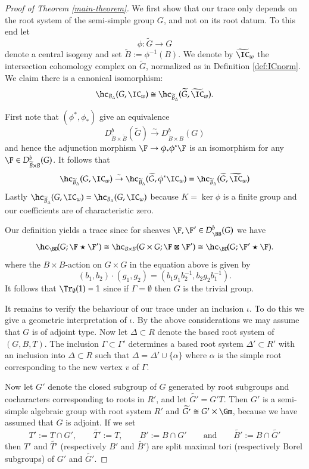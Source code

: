 \documentclass[12pt]{amsart}
\def\to{\rightarrow}
\theoremstyle{remark}
\begin{document}
\begin{proof}[Proof of Theorem \ref{main-theorem}]
We first show that our trace only depends on the root system of
the semi-simple group $G$, and not on its root datum. To this end let
\[
\phi : \widetilde{G} \to G
\]
denote a central isogeny and set $\widetilde{B} := \phi^{-1}(B)$. We
denote by $\widetilde{\IC}_w$ the intersection cohomology
complex on $\widetilde{G}$, normalized as in Definition
\ref{def:ICnorm}. We claim there is a canonical isomorphism:
\[
\hc_{{B}_{\Delta}}(G, \IC_w) \cong \hc_{\widetilde{B}_{\Delta}}(\widetilde{G}, \widetilde{\IC}_w).
\]

First note that $(\phi^*, \phi_*)$ give an equivalence
\[
D^b_{\widetilde{B} \times \widetilde{B}}(\widetilde{G})
\stackrel{\sim}{\to} D^b_{\widetilde{B} \times B}(G)
\]
and hence the
adjunction morphism $\F \to \phi_* \phi^* \F$ is an isomorphism for any $\F \in D^b_{\widetilde{B} \times B}(G)$. It
follows that
\[
\hc_{\widetilde{B}_{\Delta}}(G, \IC_w) \stackrel{\sim}{\to}
\hc_{\widetilde{B}_{\Delta}}(\widetilde{G}, \phi^*\IC_w)
= \hc_{\widetilde{B}_{\Delta}}(\widetilde{G}, \widetilde{\IC}_w)
\]
Lastly $\hc_{\widetilde{B}_{\Delta}}(G, \IC_w) = \hc_{{B}_{\Delta}}(G,
\IC_w)$ because $K = \ker \phi$ is a finite group and our coefficients are of
characteristic zero.

Our definition yields a trace since for sheaves $\F, \F^{\prime} \in D^b_{\BB}(G)$ we have
  \begin{equation*}
    \hc_{\BD}\!(G;\F\star\F')\cong \hc_{B\times B}(G\times G;\F\boxtimes\F')\cong \hc_{\BD}\!(G;\F'\star\F).
  \end{equation*}
where the $B \times B$-action on $G \times G$ in the equation above is given by
\[
(b_1, b_2) \cdot (g_1, g_2) = (b_1g_1b_2^{-1}, b_2g_2b_1^{-1}).
\]
It follows that $\Tr_{\emptyset}(1)=1$ since if $\Gamma = \emptyset$ then $G$ is the trivial group.

It remains to verify the behaviour of our trace under an inclusion
$\iota$. To do this we give a geometric interpretation of $\iota$. 
By the above considerations we may assume that $G$ is of
adjoint type. Now let $\Delta \subset R$
denote the based root system of $(G,B,T)$.  The inclusion $\Gamma
\subset \Gamma'$ determines a based root system $\Delta' \subset R'$ with an inclusion into  $\Delta \subset R$
such that $\Delta = \Delta' \cup \{ \alpha \}$ where $\alpha$ is the
simple root corresponding to the new vertex $v$ of $\Gamma$.

Now let $G'$ denote the closed subgroup of $G$ generated by root
subgroups and cocharacters corresponding to roots in $R'$, and let
$\widetilde{G'} = G'T$. Then $G'$ is a semi-simple algebraic group
with root system $R'$ and $\widetilde{G'} \cong G' \times \Gm$,
because we have assumed that $G$ is adjoint.
If we set \[
T' := T
\cap G', \qquad \widetilde{T'} := T, \qquad B' := B \cap G'\qquad  \text{and}\qquad \widetilde{B'}
:= B \cap \widetilde{G'}
\] then $T'$ and $\widetilde{T'}$ (respectively
$B'$ and $\widetilde{B'}$) are split maximal tori (respectively Borel
subgroups) of $G'$ and $\widetilde{G'}$.


\end{proof}
\end{document}
